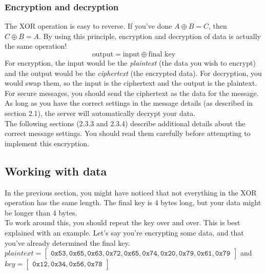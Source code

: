 \documentclass{report}
\newcommand{\code}[1]{\texttt{#1}}
\newcommand*\xor{\oplus}
\begin{document}
\subsubsection{Encryption and decryption}
The XOR operation is easy to reverse. If you've done $A \xor B = C$, then $C \xor B = A$.
By using this principle, encryption and decryption of data is actually the same operation!
\begin{equation*}
	\text{output} = \text{input} \xor \text{final key}
\end{equation*}
For encryption, the input would be the \emph{plaintext} (the data you wish to encrypt) and the output would be the \emph{ciphertext} (the encrypted data).
For decryption, you would swap them, so the input is the ciphertext and the output is the plaintext. \\

For secure messages, you should send the ciphertext as the data for the message.
As long as you have the correct settings in the message details (as described in section 2.1), the server will automatically decrypt your data. \\

The following sections (2.3.3 and 2.3.4) describe additional details about the correct message settings. You should read them carefully before attempting to implement this encryption.

\pagebreak
\subsection{Working with data}
In the previous section, you might have noticed that not everything in the XOR operation has the same length.
The final key is 4 bytes long, but your data might be longer than 4 bytes. \\

To work around this, you should repeat the key over and over. This is best explained with an example.
Let's say you're encrypting some data, and that you've already determined the final key. \\

$plaintext = \begin{bmatrix}
	\code{0x53}, \code{0x65}, \code{0x63}, \code{0x72}, \code{0x65}, \code{0x74}, \code{0x20}, \code{0x79}, \code{0x61}, \code{0x79}
\end{bmatrix}$ and $key = \begin{bmatrix}
	\code{0x12}, \code{0x34}, \code{0x56}, \code{0x78}
\end{bmatrix}$ \\
\end{document}
